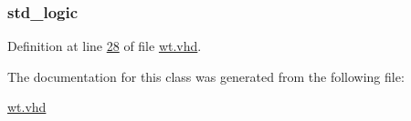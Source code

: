 \subsubsection[{sinc\+\_\+int}]{ {\bfseries \textcolor{comment}{std\+\_\+logic}\textcolor{vhdlchar}{ }} \hspace{0.3cm}{\ttfamily [Signal]}}\label{classwt_1_1wt__arch_a45126d1a75be347f440d181b7aa5e033}


Definition at line \hyperlink{wt_8vhd_source_l00028}{28} of file \hyperlink{wt_8vhd_source}{wt.\+vhd}.



The documentation for this class was generated from the following file\+:\begin{DoxyCompactItemize}
\item 
\hyperlink{wt_8vhd}{wt.\+vhd}\end{DoxyCompactItemize}

